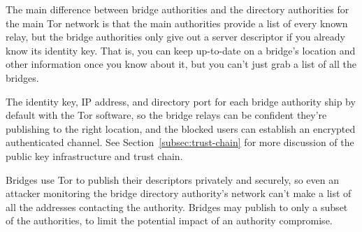 \documentclass{llncs}
\begin{document}
The main difference between bridge authorities and the directory
authorities for the main Tor network is that the main authorities provide
a list of every known relay, but the bridge authorities only give
out a server descriptor if you already know its identity key. That is,
you can keep up-to-date on a bridge's location and other information
once you know about it, but you can't just grab a list of all the bridges.

The identity key, IP address, and directory port for each bridge
authority ship by default with the Tor software, so the bridge relays
can be confident they're publishing to the right location, and the
blocked users can establish an encrypted authenticated channel. See
Section~\ref{subsec:trust-chain} for more discussion of the public key
infrastructure and trust chain.

Bridges use Tor to publish their descriptors privately and securely,
so even an attacker monitoring the bridge directory authority's network
can't make a list of all the addresses contacting the authority.
Bridges may publish to only a subset of the
authorities, to limit the potential impact of an authority compromise.


%
%
%
%
%
\end{document}
